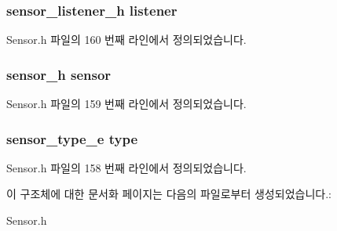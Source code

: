 \hypertarget{struct___gravity_extend_aa977dfb866b24fd7d9a20a9a01b2fd1f}{
\subsubsection[{listener}]{\setlength{\rightskip}{0pt plus 5cm}sensor\-\_\-listener\-\_\-h listener}}\label{struct___gravity_extend_aa977dfb866b24fd7d9a20a9a01b2fd1f}


Sensor.\-h 파일의 160 번째 라인에서 정의되었습니다.

\hypertarget{struct___gravity_extend_a5bae9b7801bc3808411925cde81d3f26}{
\subsubsection[{sensor}]{\setlength{\rightskip}{0pt plus 5cm}sensor\-\_\-h sensor}}\label{struct___gravity_extend_a5bae9b7801bc3808411925cde81d3f26}


Sensor.\-h 파일의 159 번째 라인에서 정의되었습니다.

\hypertarget{struct___gravity_extend_abffb09766da2fc510a79bb51f82a36e1}{
\subsubsection[{type}]{\setlength{\rightskip}{0pt plus 5cm}sensor\-\_\-type\-\_\-e type}}\label{struct___gravity_extend_abffb09766da2fc510a79bb51f82a36e1}


Sensor.\-h 파일의 158 번째 라인에서 정의되었습니다.



이 구조체에 대한 문서화 페이지는 다음의 파일로부터 생성되었습니다.\-:\begin{DoxyCompactItemize}
\item 
Sensor.\-h\end{DoxyCompactItemize}
